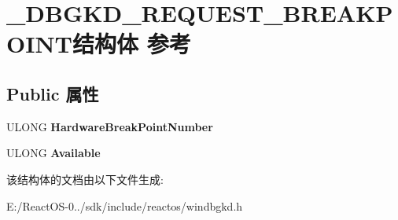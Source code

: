 \hypertarget{struct___d_b_g_k_d___r_e_q_u_e_s_t___b_r_e_a_k_p_o_i_n_t}{}\section{\+\_\+\+D\+B\+G\+K\+D\+\_\+\+R\+E\+Q\+U\+E\+S\+T\+\_\+\+B\+R\+E\+A\+K\+P\+O\+I\+N\+T结构体 参考}
\label{struct___d_b_g_k_d___r_e_q_u_e_s_t___b_r_e_a_k_p_o_i_n_t}
\subsection*{Public 属性}
\begin{DoxyCompactItemize}
\item 
\mbox{\label{struct___d_b_g_k_d___r_e_q_u_e_s_t___b_r_e_a_k_p_o_i_n_t_a6acdba722ef7d0189b87837e3dcf36cc}} 
U\+L\+O\+NG {\bfseries Hardware\+Break\+Point\+Number}
\item 
\mbox{\label{struct___d_b_g_k_d___r_e_q_u_e_s_t___b_r_e_a_k_p_o_i_n_t_aab6a95d7a5689ae3be0eaacedb88c14e}} 
U\+L\+O\+NG {\bfseries Available}
\end{DoxyCompactItemize}


该结构体的文档由以下文件生成\+:\begin{DoxyCompactItemize}
\item 
E\+:/\+React\+O\+S-\/0../sdk/include/reactos/windbgkd.\+h\end{DoxyCompactItemize}

